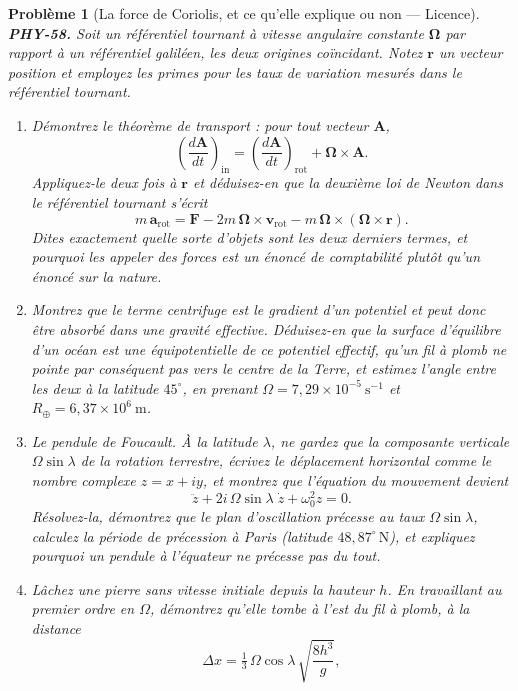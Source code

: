 \documentclass[11pt]{article}
\newtheorem{problem}{Problème}
\begin{document}
\begin{problem}[{La force de Coriolis, et ce qu'elle explique ou non --- Licence}]
\textbf{PHY-58.} Soit un référentiel tournant à vitesse angulaire constante
$ \boldsymbol{\Omega} $ par rapport à un référentiel galiléen, les deux origines coïncidant.
Notez $ \mathbf{r} $ un vecteur position et employez les primes pour les taux de variation
mesurés dans le référentiel tournant.
\begin{enumerate}
\item[(a)] Démontrez le théorème de transport : pour tout vecteur $ \mathbf{A} $,
\[ \left(\frac{d\mathbf{A}}{dt}\right)_{\text{in}}
= \left(\frac{d\mathbf{A}}{dt}\right)_{\text{rot}} + \boldsymbol{\Omega}\times\mathbf{A}. \]
Appliquez-le deux fois à $ \mathbf{r} $ et déduisez-en que la deuxième loi de Newton dans le
référentiel tournant s'écrit
\[ m\,\mathbf{a}_{\text{rot}} = \mathbf{F}
- 2m\,\boldsymbol{\Omega}\times\mathbf{v}_{\text{rot}}
- m\,\boldsymbol{\Omega}\times(\boldsymbol{\Omega}\times\mathbf{r}). \]
Dites exactement quelle sorte d'objets sont les deux derniers termes, et pourquoi les appeler des
forces est un énoncé de comptabilité plutôt qu'un énoncé sur la nature.
\item[(b)] Montrez que le terme centrifuge est le gradient d'un potentiel et peut donc être absorbé dans
une gravité \textit{effective}. Déduisez-en que la surface d'équilibre d'un océan est une
équipotentielle de ce potentiel effectif, qu'un fil à plomb ne pointe par conséquent pas vers le
centre de la Terre, et estimez l'angle entre les deux à la latitude $ 45^{\circ} $, en prenant
$ \Omega = 7{,}29\times10^{-5}\ \mathrm{s^{-1}} $ et $ R_{\oplus} = 6{,}37\times10^{6}\
\mathrm{m} $.
\item[(c)] Le pendule de Foucault. À la latitude $ \lambda $, ne gardez que la composante verticale
$ \Omega\sin\lambda $ de la rotation terrestre, écrivez le déplacement horizontal comme le
nombre complexe $ z = x + iy $, et montrez que l'équation du mouvement devient
\[ \ddot{z} + 2i\,\Omega\sin\lambda\;\dot{z} + \omega_{0}^{2} z = 0 . \]
Résolvez-la, démontrez que le plan d'oscillation précesse au taux $ \Omega\sin\lambda $,
calculez la période de précession à Paris (latitude $ 48{,}87^{\circ}\,\mathrm{N} $), et
expliquez pourquoi un pendule à l'équateur ne précesse pas du tout.
\item[(d)] Lâchez une pierre sans vitesse initiale depuis la hauteur $ h $. En travaillant au premier
ordre en $ \Omega $, démontrez qu'elle tombe à l'est du fil à plomb, à la distance
\[ \Delta x = \tfrac{1}{3}\,\Omega\cos\lambda\,\sqrt{\frac{8h^{3}}{g}}, \]

\end{enumerate}
\end{problem}
\end{document}
